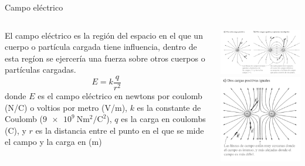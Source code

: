 \documentclass[aspectratio=169]{beamer}
\begin{document}
\begin{frame}{Campo eléctrico} 
    \begin{columns}[onlytextwidth]
    \begin{column}{0.55\textwidth}
        El campo eléctrico es la región del espacio en el que un cuerpo o partícula cargada tiene influencia, dentro de esta regíon se ejercería una fuerza sobre otros cuerpos o partículas cargadas.  
        \begin{equation*}
            E = k\dfrac{q}{r^2}
        \end{equation*}
        donde $E$ es el campo eléctrico en newtons por coulomb (\si{\newton/\coulomb}) o voltios por metro (\si{\volt/\meter}), $k$ es la constante de Coulomb ($\SI{9e9}{\newton \meter\squared / \coulomb \squared}$), $q$ es la carga en coulombs (\si{\coulomb}), y $r$ es la distancia entre el punto en el que se mide el campo y la carga en (\si{\meter})   
    \end{column}
    \begin{column}{0.45\textwidth}
        \begin{center}
            \includegraphics[scale=0.55]{fig/campo_unados.png}
            \includegraphics[scale=0.55]{fig/campo_iguales.png}
        \end{center}
    \end{column}
    \end{columns}
\end{frame}


% 

% 

\end{document}
